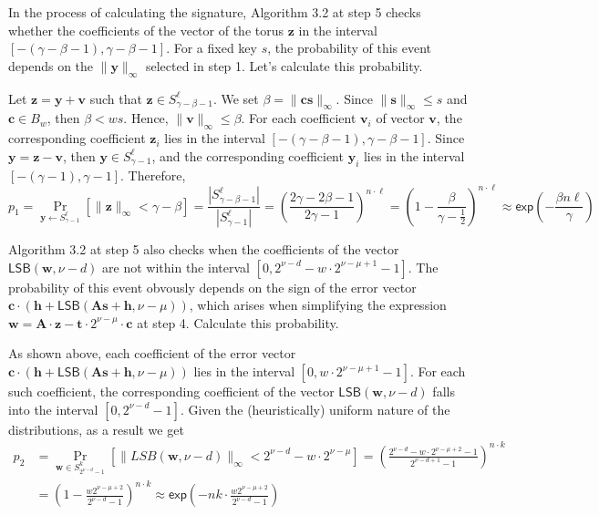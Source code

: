 \documentclass{article}
\theoremstyle{plain}
\theoremstyle{definition}
\begin{document}
    In the process of calculating the signature, Algorithm 3.2 at step 5 checks whether the coefficients of the vector of the torus $\mathbf{z}$ in the interval $[-(\gamma - \beta - 1), \gamma - \beta - 1]$. For a fixed key $s$, the probability of this event depends on the $\|\mathbf{y}\|_{\infty}$ selected in step 1. Let's calculate this probability.

    Let $\mathbf{z} = \mathbf{y} + \mathbf{v}$ such that $\mathbf{z} \in S^{\ell}_{\gamma - \beta - 1}$. We set $\beta = \|\mathbf{cs}\|_{\infty}$. Since $\|\mathbf{s}\|_{\infty} \leq s$ and $\mathbf{c} \in B_w$, then $\beta < ws$. Hence, $\|\mathbf{v}\|_{\infty} \leq \beta$. For each coefficient $\mathbf{v}_i$ of vector $\mathbf{v}$, the corresponding coefficient $\mathbf{z}_i$ lies in the interval $[-(\gamma - \beta - 1), \gamma - \beta - 1]$. Since $\mathbf{y}=\mathbf{z}-\mathbf{v}$, then $\mathbf{y} \in S^{\ell}_{\gamma-1}$, and the corresponding coefficient $\mathbf{y}_i$ lies in the interval $[-(\gamma - 1), \gamma - 1]$. Therefore,
    $$
    p_1 = \Pr\limits_{\mathbf{y} \leftarrow S^{\ell}_{\gamma-1}} [\|\mathbf{z}\|_{\infty} < \gamma - \beta] = \frac{|S^{\ell}_{\gamma - \beta - 1}|}{|S^{\ell}_{\gamma-1}|} = \left( \frac{2\gamma - 2\beta - 1}{2\gamma - 1} \right)^{n \cdot \ell} = \left( 1 - \frac{\beta}{\gamma - \frac{1}{2}} \right)^{n \cdot \ell} \approx \mathsf{exp}\left(-\frac{\beta n \ell}{\gamma}\right)
    $$

    Algorithm 3.2 at step 5 also checks when the coefficients of the vector $\mathsf{LSB}(\mathbf{w}, \nu - d)$ are not within the interval $[0, 2^{\nu - d} - w \cdot 2^{\nu - \mu + 1} - 1]$. The probability of this event obvously depends on the sign of the error vector $\mathbf{c} \cdot (\mathbf{h} + \mathsf{LSB}(\mathbf{As} + \mathbf{h}, \nu - \mu))$, which arises when simplifying the expression $\mathbf{w} = \mathbf{A} \cdot \mathbf{z} - \mathbf{t} \cdot 2^{\nu - \mu} \cdot \mathbf{c}$ at step 4. Calculate this probability.
    
    As shown above, each coefficient of the error vector $\mathbf{c} \cdot (\mathbf{h} + \mathsf{LSB}(\mathbf{As} + \mathbf{h}, \nu - \mu))$ lies in the interval $[0, w \cdot 2^{\nu -\mu + 1} - 1]$. For each such coefficient, the corresponding coefficient of the vector $\mathsf{LSB}(\mathbf{w}, \nu - d)$ falls into the interval $[0, 2^{\nu - d} - 1]$. Given the (heuristically) uniform nature of the distributions, as a result we get
    \begin{align*}
    p_2 &= \Pr\limits_{\mathbf{w} \in S^{k}_{2^{\nu - d}-1}} [\|LSB(\mathbf{w}, \nu - d)\|_\infty < 2^{\nu - d} - w \cdot 2^{\nu - \mu}] = \left( \frac{2^{\nu - d} - w \cdot 2^{\nu - \mu + 2} - 1}{2^{\nu - d + 1}-1} \right)^{n \cdot k} \\
        &= \left( 1 - \frac{w2^{\nu - \mu + 2}}{2^{\nu-d}-1} \right)^{n \cdot k} \approx \mathsf{exp}\left( -nk \cdot \frac{w2^{\nu - \mu + 2}}{2^{\nu-d}-1} \right)
    \end{align*}
\end{document}
